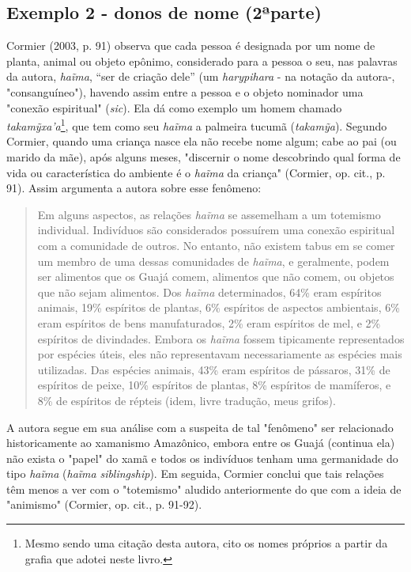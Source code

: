 \subsection{Exemplo 2 - donos de nome (2ªparte)}

Cormier (2003, p. 91) observa que cada pessoa é designada por um nome de
planta, animal ou objeto epônimo, considerado para a pessoa o seu, nas
palavras da autora, \emph{haĩma}, ``ser de criação dele'' (um
\emph{harypihara} - na notação da autora-, "consanguíneo"), havendo
assim entre a pessoa e o objeto nominador uma "conexão espiritual"
(\emph{sic}). Ela dá como exemplo um homem chamado
\emph{takamỹxa'a}\footnote{Mesmo sendo uma citação desta autora, cito os
  nomes próprios a partir da grafia que adotei neste livro.}, que tem
como seu \emph{haĩma} a palmeira tucumã (\emph{takamỹa}). Segundo
Cormier, quando uma criança nasce ela não recebe nome algum; cabe ao pai
(ou marido da mãe), após alguns meses, "discernir o nome descobrindo
qual forma de vida ou característica do ambiente é o \emph{haĩma} da
criança" (Cormier, op. cit., p. 91). Assim argumenta a autora sobre esse
fenômeno:

\begin{quote}
Em alguns aspectos, as relações \emph{haĩma} se assemelham a um
totemismo individual. Indivíduos são considerados possuírem uma conexão
espiritual com a comunidade de outros. No entanto, não existem tabus em
se comer um membro de uma dessas comunidades de \emph{haĩma}, e
geralmente, podem ser alimentos que os Guajá comem, alimentos que não
comem, ou objetos que não sejam alimentos. Dos \emph{haĩma}
determinados, 64\% eram espíritos animais, 19\% espíritos de plantas,
6\% espíritos de aspectos ambientais, 6\% eram espíritos de bens
manufaturados, 2\% eram espíritos de mel, e 2\% espíritos de divindades.
Embora os \emph{haĩma} fossem tipicamente representados por espécies
úteis, eles não representavam necessariamente as espécies mais
utilizadas. Das espécies animais, 43\% eram espíritos de pássaros, 31\%
de espíritos de peixe, 10\% espíritos de plantas, 8\% espíritos de
mamíferos, e 8\% de espíritos de répteis (idem, livre tradução, meus
grifos).
\end{quote}

A autora segue em sua análise com a suspeita de tal "fenômeno" ser
relacionado historicamente ao xamanismo Amazônico, embora entre os Guajá
(continua ela) não exista o "papel" do xamã e todos os indivíduos tenham
uma germanidade do tipo \emph{haĩma} (\emph{haĩma} \emph{siblingship}).
Em seguida, Cormier conclui que tais relações têm menos a ver com o
"totemismo" aludido anteriormente do que com a ideia de "animismo"
(Cormier, op. cit., p. 91-92).

